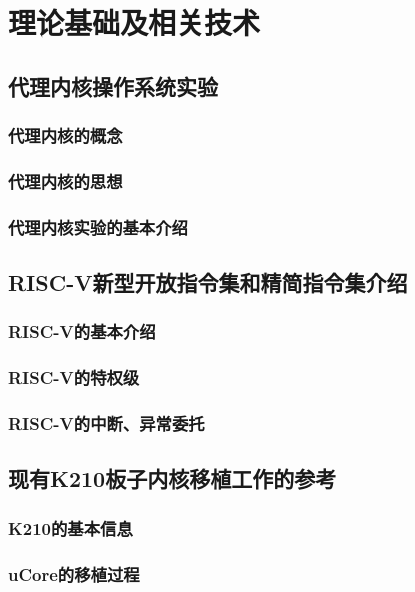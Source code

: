 %
%
%
%
%
%

\chapter{理论基础及相关技术}

\section{代理内核操作系统实验}

\subsection{代理内核的概念}

\subsection{代理内核的思想}

\subsection{代理内核实验的基本介绍}

\section{RISC-V新型开放指令集和精简指令集介绍}

\subsection{RISC-V的基本介绍}

\subsection{RISC-V的特权级}

\subsection{RISC-V的中断、异常委托}

\section{现有K210板子内核移植工作的参考}

\subsection{K210的基本信息}

\subsection{uCore的移植过程}

